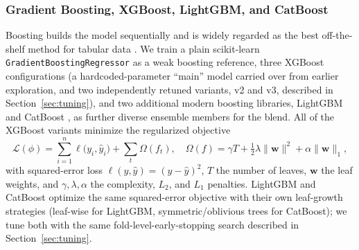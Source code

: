 \documentclass[journal]{IEEEtran}
\begin{document}
\subsubsection{Gradient Boosting, XGBoost, LightGBM, and CatBoost}
Boosting builds the model sequentially and is widely regarded as the best
off-the-shelf method for tabular data \cite{friedman2001,chen2016xgboost}. We
train a plain scikit-learn \texttt{GradientBoostingRegressor} as a weak
boosting reference, three XGBoost configurations (a hardcoded-parameter
``main'' model carried over from earlier exploration, and two independently
retuned variants, v2 and v3, described in Section~\ref{sec:tuning}), and two
additional modern boosting libraries, LightGBM \cite{ke2017lightgbm} and
CatBoost \cite{prokhorenkova2018catboost}, as further diverse ensemble members
for the blend. All of the XGBoost variants minimize the regularized objective
\begin{equation}
\mathcal{L}(\phi)=\sum_{i=1}^{n}\ell\!\big(y_i,\hat y_i\big)
+\sum_{t}\Omega(f_t),\quad
\Omega(f)=\gamma T+\tfrac{1}{2}\lambda\lVert\mathbf{w}\rVert^{2}
+\alpha\lVert\mathbf{w}\rVert_{1},
\label{eq:xgbobj}
\end{equation}
with squared-error loss $\ell(y,\hat y)=(y-\hat y)^2$, $T$ the number of leaves,
$\mathbf{w}$ the leaf weights, and $\gamma,\lambda,\alpha$ the complexity,
$L_2$, and $L_1$ penalties. LightGBM and CatBoost optimize the same squared-error
objective with their own leaf-growth strategies (leaf-wise for LightGBM,
symmetric/oblivious trees for CatBoost); we tune both with the same
fold-level-early-stopping search described in Section~\ref{sec:tuning}.
\end{document}
